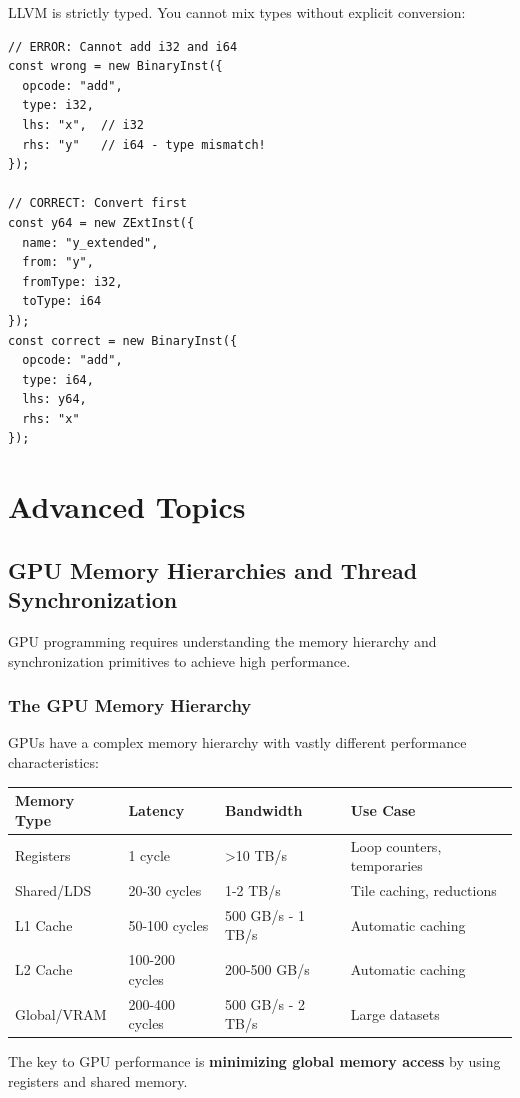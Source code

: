 \documentclass[11pt,oneside]{book}
\begin{document}
LLVM is strictly typed. You cannot mix types without explicit conversion:

\begin{lstlisting}[style=ts]
// ERROR: Cannot add i32 and i64
const wrong = new BinaryInst({
  opcode: "add",
  type: i32,
  lhs: "x",  // i32
  rhs: "y"   // i64 - type mismatch!
});

// CORRECT: Convert first
const y64 = new ZExtInst({
  name: "y_extended",
  from: "y",
  fromType: i32,
  toType: i64
});
const correct = new BinaryInst({
  opcode: "add",
  type: i64,
  lhs: y64,
  rhs: "x"
});
\end{lstlisting}

\part{Advanced Topics}

\chapter{GPU Memory Hierarchies and Thread Synchronization}

GPU programming requires understanding the memory hierarchy and synchronization primitives to achieve high performance.

\section{The GPU Memory Hierarchy}

GPUs have a complex memory hierarchy with vastly different performance characteristics:

\begin{longtable}{|p{3cm}|p{2.5cm}|p{3cm}|p{4.5cm}|}
\hline
\textbf{Memory Type} & \textbf{Latency} & \textbf{Bandwidth} & \textbf{Use Case} \\
\hline
Registers & 1 cycle & >10 TB/s & Loop counters, temporaries \\
\hline
Shared/LDS & 20-30 cycles & 1-2 TB/s & Tile caching, reductions \\
\hline
L1 Cache & 50-100 cycles & 500 GB/s - 1 TB/s & Automatic caching \\
\hline
L2 Cache & 100-200 cycles & 200-500 GB/s & Automatic caching \\
\hline
Global/VRAM & 200-400 cycles & 500 GB/s - 2 TB/s & Large datasets \\
\hline
\end{longtable}

The key to GPU performance is \textbf{minimizing global memory access} by using registers and shared memory.
\end{document}

